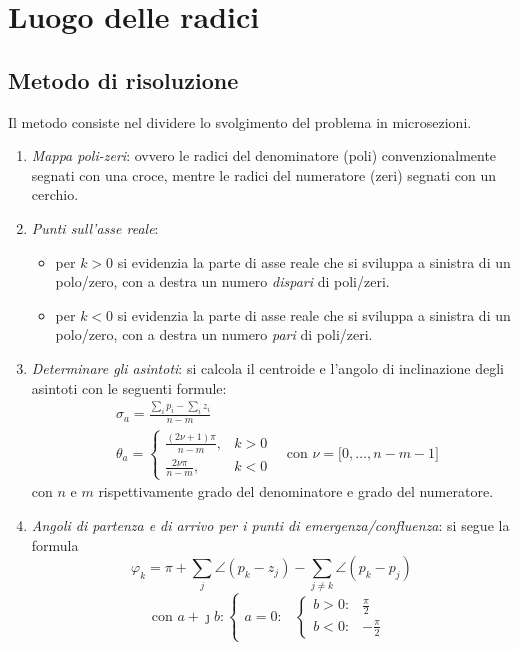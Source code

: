 \chapter{Luogo delle radici}
\section{Metodo di risoluzione}
Il metodo consiste nel dividere lo svolgimento del problema in microsezioni.
\begin{enumerate}
	\item \emph{Mappa poli-zeri}: ovvero le radici del denominatore (poli)
		convenzionalmente segnati con una croce, mentre le radici del
		numeratore (zeri) segnati con un cerchio.
	\item \emph{Punti sull'asse reale}:
		\begin{itemize}
			\item per \(k>0\) si evidenzia la parte di asse reale
			che si sviluppa a sinistra di un polo/zero, con a destra
			un numero \emph{dispari} di poli/zeri.
			\item per \(k<0\) si evidenzia la parte di asse reale
			che si sviluppa a sinistra di un polo/zero, con a destra
			un numero \emph{pari} di poli/zeri.
		\end{itemize}
	\item \emph{Determinare gli asintoti}: si calcola il centroide e l'angolo
		di inclinazione degli asintoti con le seguenti formule:
		\begin{align*}
			& \sigma_a = \frac{\sum_{i} p_i - \sum_{i} z_i}{n-m} \\
			& \theta_a = \begin{cases}
					\frac{(2\nu+1)\pi}{n-m}, & k>0 \\
					\frac{2\nu\pi}{n-m}, & k<0
				\end{cases}
				\quad \text{con } \nu = \bigl[0,\dots,n-m-1\bigr]
		\end{align*}
		con \(n\) e \(m\) rispettivamente grado del denominatore e grado del numeratore.
	\item \emph{Angoli di partenza e di arrivo per i punti di emergenza/confluenza}:
		si segue la formula
		\[
			\varphi_k = \pi +\sum_j \angle(p_k-z_j) -\sum_{j \neq k} \angle(p_k-p_j)
		\]
		\[
			\text{con } a+\jmath b \colon
			\begin{cases}
				a = 0 \colon &
					\begin{cases}
						b > 0\colon & \frac{\pi}{2} \\
						b < 0\colon & -\frac{\pi}{2}

\end{cases}
\end{cases}\]
\end{enumerate}
